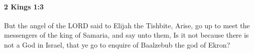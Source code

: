 
		\paragraph{2 Kings 1:3} %
			\label{2KINGS-1-3}

			But the angel of the LORD said to Elijah the Tishbite, Arise, go up to meet the messengers of the king of Samaria, and say unto them, Is it not because there is not a God in Israel, that ye go to enquire of Baalzebub the god of Ekron?


